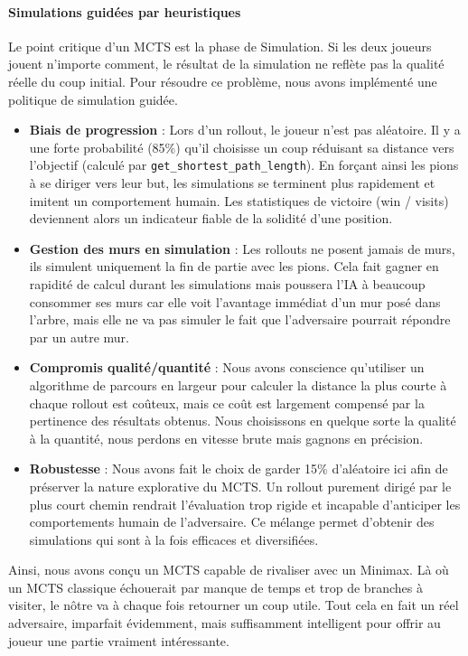 \documentclass[a4paper]{article}
\begin{document}
\bigskip

\paragraph{Simulations guidées par heuristiques} Le point critique d’un MCTS est la phase de Simulation. Si les deux joueurs jouent n’importe comment, le résultat de la simulation ne reflète pas la qualité réelle du coup initial. Pour résoudre ce problème, nous avons implémenté une politique de simulation guidée.

\begin{itemize}
    \item \textbf{Biais de progression} : Lors d’un rollout, le joueur n’est pas aléatoire. Il y a une forte probabilité (85\%) qu’il choisisse un coup réduisant sa distance vers l’objectif (calculé par \texttt{get\_shortest\_path\_length}). En forçant ainsi les pions à se diriger vers leur but, les simulations se terminent plus rapidement et imitent un comportement humain. Les statistiques de victoire (win / visits) deviennent alors un indicateur fiable de la solidité d’une position. 
    \item \textbf{Gestion des murs en simulation} : Les rollouts ne posent jamais de murs, ils simulent uniquement la fin de partie avec les pions. Cela fait gagner en rapidité de calcul durant les simulations mais poussera l’IA à beaucoup consommer ses murs car elle voit l’avantage immédiat d’un mur posé dans l’arbre, mais elle ne va pas simuler le fait que l’adversaire pourrait répondre par un autre mur.
    \item \textbf{Compromis qualité/quantité} : Nous avons conscience qu’utiliser un algorithme de parcours en largeur pour calculer la distance la plus courte à chaque rollout est coûteux, mais ce coût est largement compensé par la pertinence des résultats obtenus. Nous choisissons en quelque sorte la qualité à la quantité, nous perdons en vitesse brute mais gagnons en précision.
    \item \textbf{Robustesse} : Nous avons fait le choix de garder 15\% d’aléatoire ici afin de préserver la nature explorative du MCTS. Un rollout purement dirigé par le plus court chemin rendrait l’évaluation trop rigide et incapable d’anticiper les comportements humain de l’adversaire. Ce mélange permet d’obtenir des simulations qui sont à la fois efficaces et diversifiées.
\end{itemize}


\bigskip

Ainsi, nous avons conçu un MCTS capable de rivaliser avec un Minimax. 
Là où un MCTS classique échouerait par manque de temps et trop de branches à visiter, 
le nôtre va à chaque fois retourner un coup utile. Tout cela en fait un réel adversaire, 
imparfait évidemment, mais suffisamment intelligent pour offrir au joueur une partie vraiment intéressante.
\end{document}
